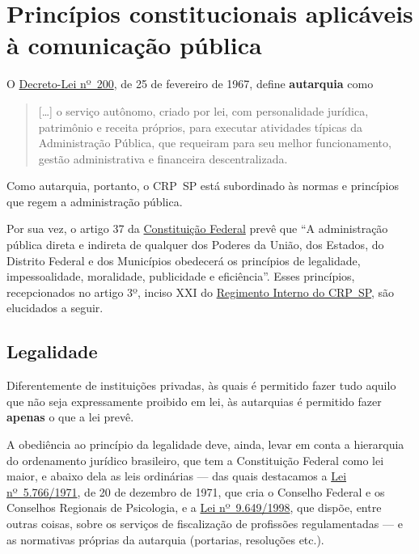 \section{Princípios constitucionais aplicáveis à comunicação
  pública}

O
\href{https://www.planalto.gov.br/ccivil_03/decreto-lei/del0200.htm}{{Decreto-Lei
			nº~200}}, de 25 de fevereiro de 1967, define \textbf{autarquia} como

\begin{quote}
	{[}\ldots{]} o serviço autônomo, criado por lei, com personalidade
	jurídica, patrimônio e receita próprios, para executar atividades
	típicas da Administração Pública, que requeiram para seu melhor
	funcionamento, gestão administrativa e financeira descentralizada.
\end{quote}

Como autarquia, portanto, o CRP~SP está subordinado às normas e
princípios que regem a administração pública.

Por sua vez, o artigo 37 da
\href{https://www.planalto.gov.br/ccivil_03/constituicao/constituicao.htm}{{Constituição
			Federal}} prevê que ``A administração pública direta e indireta de
qualquer dos Poderes da União, dos Estados, do Distrito Federal e dos
Municípios obedecerá os princípios de legalidade, impessoalidade,
moralidade, publicidade e eficiência''. Esses princípios, recepcionados
no artigo 3º, inciso XXI do
\href{https://correio.crpsp.org.br/service/home/~/?auth=co&loc=pt_BR&id=4201&part=6}{{Regimento
			Interno do CRP~SP}}, são elucidados a seguir.

\subsection{Legalidade}

Diferentemente de instituições privadas, às quais é permitido fazer tudo
aquilo que não seja expressamente proibido em lei, às autarquias é
permitido fazer \textbf{apenas} o que a lei prevê.

A obediência ao princípio da legalidade deve, ainda, levar em conta a
hierarquia do ordenamento jurídico brasileiro, que tem a Constituição
Federal como lei maior, e abaixo dela as leis ordinárias --- das quais
destacamos a
\href{https://www.google.com/url?sa=t&source=web&rct=j&opi=89978449&url=https://www.planalto.gov.br/ccivil_03/leis/l5766.htm&ved=2ahUKEwi7voyM_MKJAxWYF7kGHcbCO54QFnoECBMQAw&usg=AOvVaw3BsZ1ugMxVxz5tlw9ZAIyv}{{Lei
			nº~5.766/1971}}, de 20 de dezembro de 1971, que cria o Conselho Federal
e os Conselhos Regionais de Psicologia, e a
\href{https://www.google.com/url?sa=t&source=web&rct=j&opi=89978449&url=https://www.planalto.gov.br/ccivil_03/leis/l9649cons.htm&ved=2ahUKEwjLibuZ_MKJAxVuILkGHaPnFtcQFnoECAoQAQ&usg=AOvVaw1dF6QYD5NfkI-TBa6TTJgo}{{Lei
			nº~9.649/1998}}, que dispõe, entre outras coisas, sobre os serviços de
fiscalização de profissões regulamentadas --- e as normativas próprias
da autarquia (portarias, resoluções etc.).

